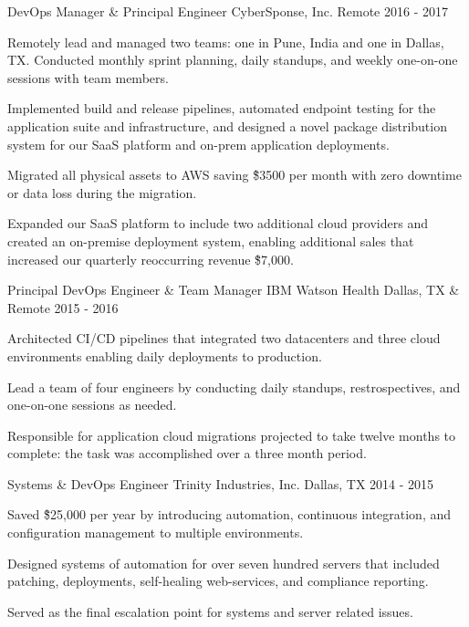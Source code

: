 \begin{cventries}
  \cventry
    {DevOps Manager \& Principal Engineer} %
    {CyberSponse, Inc.} %
    {Remote} %
    {2016 - 2017} %
    {
      \begin{cvitems} %
        \item {Remotely lead and managed two teams: one in Pune, India and one in Dallas, TX. Conducted monthly sprint planning, daily standups, and weekly one-on-one sessions with team members.}
  \item {Implemented build and release pipelines, automated endpoint testing for the application suite and infrastructure, and designed a novel package distribution system for our SaaS platform and on-prem application deployments.}
  \item {Migrated all physical assets to AWS saving \~\$3500 per month with zero downtime or data loss during the migration.}
  \item {Expanded our SaaS platform to include two additional cloud providers and created an on-premise deployment system, enabling additional sales that increased our quarterly reoccurring revenue \~\$7,000.}
      \end{cvitems}
    }

  \cventry
    {Principal DevOps Engineer \& Team Manager} %
    {IBM Watson Health} %
    {Dallas, TX \& Remote} %
    {2015 - 2016} %
    {
      \begin{cvitems} %
        \item {Architected CI/CD pipelines that integrated two datacenters and three cloud environments enabling daily deployments to production.}
  \item {Lead a team of four engineers by conducting daily standups, restrospectives, and one-on-one sessions as needed.}
  \item {Responsible for application cloud migrations projected to take twelve months to complete: the task was accomplished over a three month period.}
      \end{cvitems}
    }
    
  \cventry
    {Systems \& DevOps Engineer} %
    {Trinity Industries, Inc.} %
    {Dallas, TX} %
    {2014 - 2015} %
    {
      \begin{cvitems} %
        \item {Saved \~\$25,000 per year by introducing automation, continuous integration, and configuration management to multiple environments.}
  \item {Designed systems of automation for over seven hundred servers that included patching, deployments, self-healing web-services, and compliance reporting.}
  \item {Served as the final escalation point for systems and server related issues.}
      \end{cvitems}
    }


\end{cventries}
